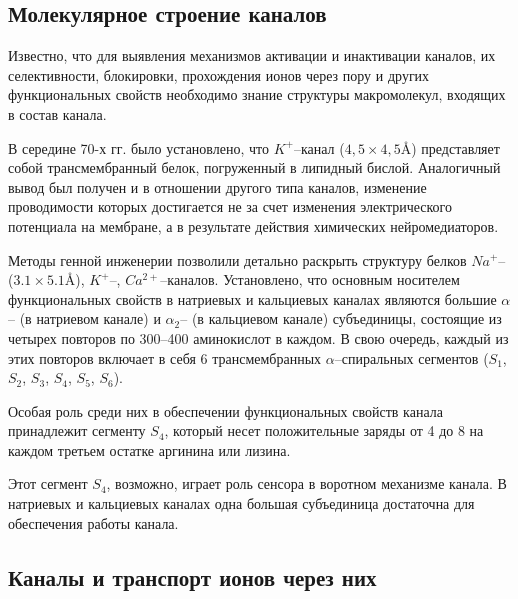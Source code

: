 \documentclass[12pt,a4paper,oneside]{book}
\begin{document}
\subsection{Молекулярное строение каналов}

Известно, что для выявления механизмов активации и инактивации каналов, их селективности, блокировки, прохождения ионов через пору и других функциональных свойств необходимо знание структуры макромолекул, входящих в состав канала.

В середине 70-х гг. было установлено, что $K^+$--канал ($4,5 \times 4,5 \text{\AA}$) представляет собой трансмембранный белок, погруженный в липидный бислой. Аналогичный вывод был получен и в отношении другого типа каналов, изменение проводимости которых достигается не за счет изменения электрического потенциала на мембране, а в результате действия химических нейромедиаторов.

Методы генной инженерии позволили детально раскрыть структуру белков $Na^+$-- ($3.1 \times 5.1 \text{\AA}$), $K^+$--, $Ca^{2+}$--каналов. Установлено, что основным носителем функциональных свойств в натриевых и кальциевых каналах являются большие $\alpha$-- (в натриевом канале) и $\alpha_2$-- (в кальциевом канале) субъединицы, состоящие из четырех повторов по 300--400 аминокислот в каждом. В свою очередь, каждый из этих повторов включает в себя 6 трансмембранных $\alpha$--спиральных сегментов ($S_1$, $S_2$, $S_3$, $S_4$, $S_5$, $S_6$).

Особая роль среди них в обеспечении функциональных свойств канала принадлежит сегменту $S_4$, который несет положительные заряды от 4 до 8 на каждом третьем остатке аргинина или лизина. 

Этот сегмент $S_4$, возможно, играет роль сенсора в воротном механизме канала. В натриевых и кальциевых каналах одна большая субъединица достаточна для обеспечения работы канала.

 
\subsection{Каналы и транспорт ионов через них}
\end{document}
